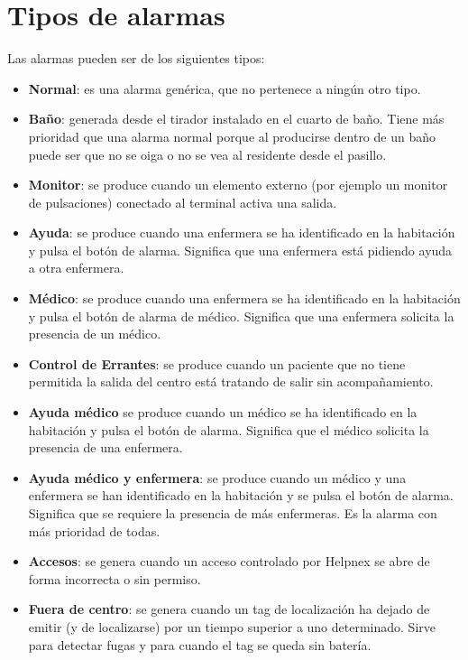 \chapter{Tipos de alarmas}
\label{anexo-d}

Las alarmas pueden ser de los siguientes tipos:

\begin{itemize}
    \item \textbf{Normal}: es una alarma genérica, que no pertenece a ningún otro tipo.
    \item \textbf{Baño}: generada desde el tirador instalado en el cuarto de baño. Tiene más prioridad que una alarma normal porque al producirse dentro de un baño puede ser que no se oiga o no se vea al residente desde el pasillo.
    \item \textbf{Monitor}: se produce cuando un elemento externo (por ejemplo un monitor de pulsaciones) conectado al terminal activa una salida.
    \item \textbf{Ayuda}: se produce cuando una enfermera se ha identificado en la habitación y pulsa el botón de alarma. Significa que una enfermera está pidiendo ayuda a otra enfermera.
    \item \textbf{Médico}: se produce cuando una enfermera se ha identificado en la habitación y pulsa el botón de alarma de médico. Significa que una enfermera solicita la presencia de un médico.
    \item \textbf{Control de Errantes}: se produce cuando un paciente que no tiene permitida la salida del centro está tratando de salir sin acompañamiento.
    \item \textbf{Ayuda médico} se produce cuando un médico se ha identificado en la habitación y pulsa el botón de alarma. Significa que el médico solicita la presencia de una enfermera.
    \item \textbf{Ayuda médico y enfermera}: se produce cuando un médico y una enfermera se han identificado en la habitación y se pulsa el botón de alarma. Significa que se requiere la presencia de más enfermeras. Es la alarma con más prioridad de todas.
    \item \textbf{Accesos}: se genera cuando un acceso controlado por Helpnex se abre de forma incorrecta o sin permiso.
    \item \textbf{Fuera de centro}: se genera cuando un tag de localización ha dejado de emitir (y de localizarse) por un tiempo superior a uno determinado. Sirve para detectar fugas y para cuando el tag se queda sin batería.
\end{itemize}